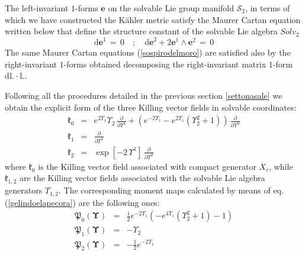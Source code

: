 \documentclass[10pt,a4paper]{article}
\begin{document}
 The left-invariant $1$-forms $\mathbf{e}$ on the solvable Lie group manifold $\mathcal{S}_2$, in terms of which we have constructed the K\"ahler metric satisfy the Maurer Cartan equation written below that define the structure constant of the solvable Lie algebra $Solv_2$
 \begin{equation}\label{sospirodelmoro}
   \text{d$\mathbf{e}$}^1\, = \, 0 \quad ; \quad \text{d$\mathbf{e}$}^2+2 \mathbf{e} ^1 \wedge\mathbf{e} ^2
   \, = \,  0
 \end{equation}
The same Maurer Cartan equations (\ref{sospirodelmoro}) are satisfied also by the right-invariant $1$-forms obtained decomposing the right-invariant matrix $1$-form $\mathrm{d}\mathbb{L}\cdot \mathbb{L}$.
\par
Following all the procedures detailed in the previous section \ref{settonasale} we obtain the explicit form of
the three Killing vector fields in solvable coordinates:
\begin{eqnarray}
\label{stendivettore}
  \boldsymbol{\mathfrak{k}}_0 &=&  e^{2 \Upsilon _1} \Upsilon _2\, \frac{\partial}{\partial \Upsilon^1}+ \left(e^{-2 \Upsilon _1}-e^{2
   \Upsilon _1} \left(\Upsilon _2^2+1\right)\right)\, \frac{\partial}{\partial \Upsilon^2} \nonumber \\
  \boldsymbol{\mathfrak{k}}_1 &=& \frac{\partial}{\partial \Upsilon^1} \nonumber \\
  \boldsymbol{\mathfrak{k}}_2 &=& \exp\left[-2 \, \Upsilon^1\right]\, \frac{\partial}{\partial \Upsilon^2}
\end{eqnarray}
where $\boldsymbol{\mathfrak{k}}_0$ is the Killing vector field associated with compact generator $X_c$,
while $\boldsymbol{\mathfrak{k}}_{1,2}$ are the Killing vector fields associated with the solvable Lie algebra generators $T_{1,2}$. The corresponding moment maps calculated by means of eq.(\ref{gelindoelapecora}) are the following ones:
\begin{eqnarray}
\label{natalepomeriggio}
  \mathfrak{P}_0(\boldsymbol{\Upsilon}) &=& \frac{1}{2} e^{-2 \Upsilon _1} \left(-e^{4 \Upsilon _1} \left(\Upsilon
   _2^2+1\right)-1\right) \nonumber\\
  \mathfrak{P}_1(\boldsymbol{\Upsilon}) &=& -\Upsilon _2 \nonumber\\
  \mathfrak{P}_2(\boldsymbol{\Upsilon}) &=& -\frac{1}{2} e^{-2 \Upsilon _1}
\end{eqnarray}
\end{document}
